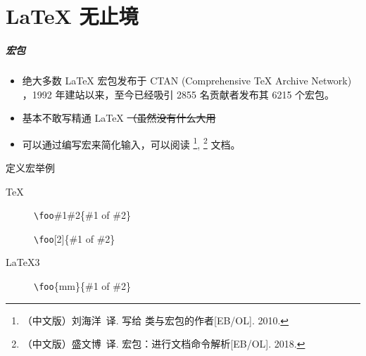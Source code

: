 
\part{\LaTeX{} 无止境}

\begin{frame}
  \frametitle{宏包}

  \begin{itemize}
    \item 绝大多数 \LaTeX{} 宏包发布于 CTAN (Comprehensive \TeX{} Archive Network) ，1992 年建站以来，至今已经吸引 2855 名贡献者发布其 6215 个宏包。 
    \item {}基本不敢写精通 \LaTeX{} \sout{（虽然没有什么大用}
    \item 可以通过编写宏来简化输入，可以阅读 \footnote{（中文版）刘海洋~译. 写给 \LaTeXe{} 类与宏包的作者[EB/OL]. 2010. }, 
    \footnote{（中文版）盛文博~译.  宏包：进行文档命令解析[EB/OL]. 2018. } 文档。
  \end{itemize}

  \begin{exampleblock}{定义宏举例}
    \begin{description}
      \item[\TeX] \texttt{\textbackslash{}foo}\#1\#2\{\#1 of \#2\}
      \item[\LaTeXe] \texttt{\textbackslash{}foo}[2]\{\#1 of \#2\}
      \item[\LaTeX3] \texttt{\textbackslash{}foo}\{mm\}\{\#1 of \#2\}
    \end{description}
  \end{exampleblock}


  
\end{frame}

